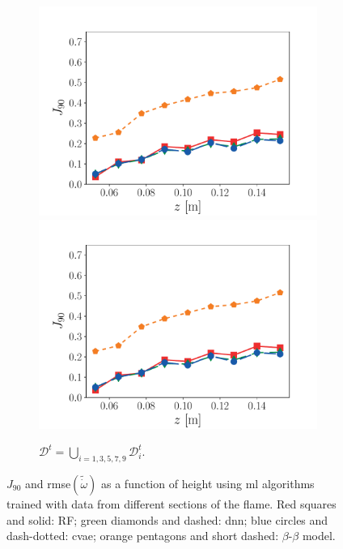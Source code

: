 \documentclass[review]{elsarticle}
\newcommand{\wt}[1]{\widetilde{#1}}
\begin{document}
\begin{figure}[!tbp]
\begin{subfigure}[t]{0.32\textwidth}
    \includegraphics[page=1,width=\textwidth]{./figs/dice_predictions_skip.pdf}\\%
    \includegraphics[page=2,width=\textwidth]{./figs/dice_predictions_skip.pdf}%
    \caption{$\mathcal{D}^t = \bigcup\limits_{i=1, 3, 5, 7, 9} \mathcal{D}_i^t$.}\label{fig:gen_skip}%
  \end{subfigure}%
  \caption{$J_{90}$ and \gls{rmse}$(\wt{\dot{\omega}})$ as a function of
    height using \gls{ml} algorithms trained with data from different
    sections of the flame. Red squares and solid: RF; green diamonds
    and dashed: \gls{dnn}; blue circles and dash-dotted: \gls{cvae}; orange
    pentagons and short dashed: $\beta$-$\beta$ model.}\label{fig:gen}%
\end{figure}%
\end{document}
